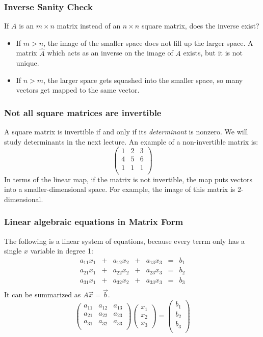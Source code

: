 \documentclass[12pt]{beamer}
\theoremstyle{definition}
\begin{document}
\begin{frame}
\frametitle{Inverse Sanity Check}
If $A$ is an $m \times n$ matrix instead of an $n \times n$ square matrix,
does the inverse exist?
\begin{itemize}
\item If $m > n$, the image of the smaller space does not fill up the larger space.
A matrix $\hat{A}$ which acts as an inverse on the image of $A$ exists, but it
is not unique.

\item If $n > m$, the larger space gets squashed into the smaller space, so many
vectors get mapped to the same vector.
\end{itemize}
\end{frame}


\begin{frame}
\frametitle{Not all square matrices are invertible}

A square matrix is invertible if and only if 
its {\em determinant} is nonzero. We will study determinants
in the next lecture. An example of a non-invertible matrix is:
\[
 \left(
\begin{array}{ccccccc}
1 & 2 & 3 \\
4 & 5 & 6 \\ 
1 & 1 & 1 \\ 
\end{array} \right) 
\]
In terms of the linear map, if the matrix is not invertible,
the map puts vectors into a smaller-dimensional space. For example,
the image of this matrix is 2-dimensional.

\end{frame}

\begin{frame}
\frametitle{Linear algebraic equations in Matrix Form}

The following is a linear system of equations, because
every terrm only has a single $x$ variable in degree 1:
\[
\begin{array}{ccccccc}
a_{11} x_1 & + & a_{12}x_2 &  + & a_{13} x_3 & = & b_1 \\
a_{21} x_1 & + & a_{22}x_2 &  + & a_{23} x_3 & = & b_2 \\
a_{31} x_1 & + & a_{32}x_2 &  + & a_{33} x_3 & = & b_3 \\
\end{array}
\]
It can be summarized as $A \vec{x} =\vec{b}$. 
\[ \left(
\begin{array}{ccccccc}
a_{11}  & a_{12} & a_{13} \\
a_{21}  & a_{22} & a_{23} \\ 
a_{31}  & a_{32} & a_{33} \\ 
\end{array} \right) \left( \begin{array}{c}
x_1 \\ x_2 \\ x_3 \end{array}
\right) =
 \left(
\begin{array}{ccccccc}
b_1\\
b_2 \\ 
b_3\\
\end{array} \right)
\]
\end{frame}
\end{document}
